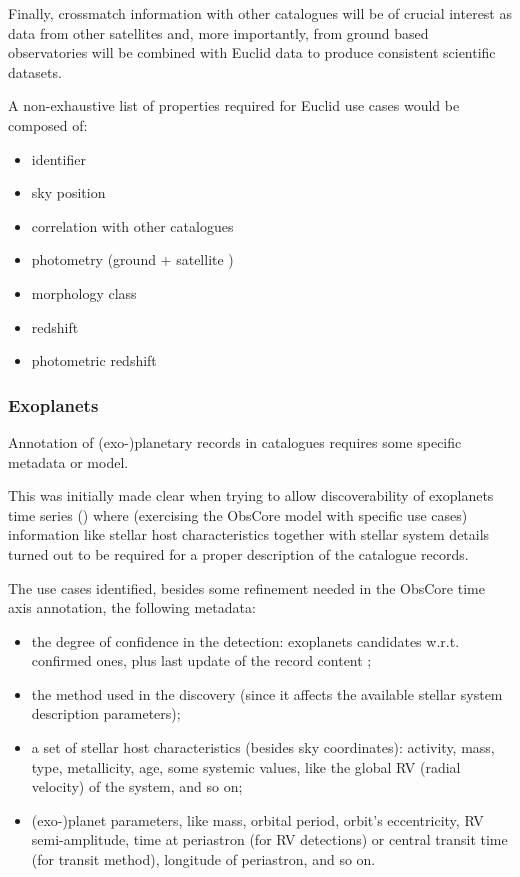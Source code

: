 \documentclass[11pt,a4paper]{ivoa}
\begin{document}
Finally, crossmatch information with other catalogues will be of crucial interest
as data from other satellites and, more importantly, from ground based
observatories will be combined with Euclid data to produce consistent scientific
datasets.

A non-exhaustive list of properties required for Euclid use cases would be composed
of:
\begin{itemize}
    \item identifier
    \item sky position
    \item correlation with other catalogues
    \item photometry (ground + satellite )
    \item morphology class
    \item redshift
    \item photometric redshift
\end{itemize}

\subsubsection{Exoplanets}
Annotation of (exo-)planetary records in catalogues requires some
specific metadata or model.

This was initially made clear when trying to
allow discoverability of exoplanets time series
(\cite{2020ASPC..522..703M}) where (exercising the
ObsCore model with specific use cases) information like stellar host
characteristics together with stellar system details turned out to be required for a
proper description of the catalogue records.

The use cases identified,
besides some refinement needed in the ObsCore time axis annotation, the
following metadata:
\begin{itemize}
	\item the degree of confidence in the detection: exoplanets candidates
w.r.t. confirmed ones, plus last update of the record content ;
	\item the method used in the discovery (since it affects the available
stellar system description parameters);
	\item a set of stellar host characteristics (besides sky coordinates):
activity, mass, type,
metallicity, age, some systemic values, like the global RV (radial
velocity) of the system, and so on;
	\item (exo-)planet parameters, like mass, orbital period, orbit's
eccentricity, RV semi-amplitude, time at periastron (for RV detections)
or central transit time (for transit method), longitude of periastron,
and so on.
\end{itemize}
\end{document}
